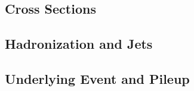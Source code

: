 \subsection{Cross Sections}

\subsection{Hadronization and Jets}

\subsection{Underlying Event and Pileup}
